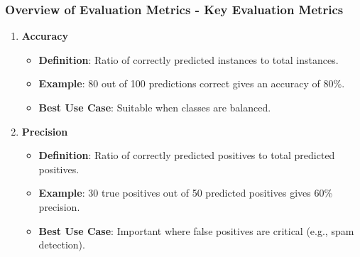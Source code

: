 \documentclass[aspectratio=169]{beamer}
\begin{document}
\begin{frame}[fragile]
    \frametitle{Overview of Evaluation Metrics - Key Evaluation Metrics}
    \begin{enumerate}
        \item \textbf{Accuracy}
        \begin{itemize}
            \item \textbf{Definition}: Ratio of correctly predicted instances to total instances.
            \item \textbf{Example}: 80 out of 100 predictions correct gives an accuracy of 80\%.
            \item \textbf{Best Use Case}: Suitable when classes are balanced.
        \end{itemize}
        
        \item \textbf{Precision}
        \begin{itemize}
            \item \textbf{Definition}: Ratio of correctly predicted positives to total predicted positives.
            \item \textbf{Example}: 30 true positives out of 50 predicted positives gives 60\% precision.
            \item \textbf{Best Use Case}: Important where false positives are critical (e.g., spam detection).
        \end{itemize}
    \end{enumerate}
\end{frame}
\end{document}
